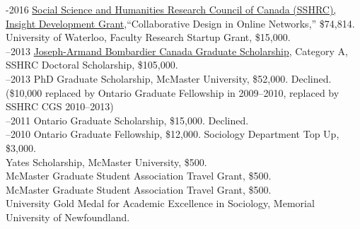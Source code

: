 \documentclass[11pt,usenames,dvipsnames]{article}
\begin{document}



-2016 \href{http://www.sshrc-crsh.gc.ca/funding-financement/programs-programmes/insight_development_grants-subventions_de_developpement_savoir-eng.aspx}{Social Science and Humanities Research Council of Canada (SSHRC), Insight Development Grant},``Collaborative Design in Online Networks,'' \$74,814. \\

 University of Waterloo, Faculty Research Startup Grant, \$15,000. \\

–2013 \href{http://www.sshrc-crsh.gc.ca/funding-financement/programs-programmes/fellowships/doctoral-doctorat-eng.aspx}{Joseph-Armand Bombardier Canada Graduate Scholarship}, Category A, SSHRC Doctoral Scholarship, \$105,000.\\

–2013 PhD Graduate Scholarship, McMaster University, \$52,000. Declined. (\$10,000 replaced by Ontario Graduate Fellowship in 2009–2010, replaced by SSHRC CGS 2010–2013)\\

–2011 Ontario Graduate Scholarship, \$15,000. Declined.\\

–2010 Ontario Graduate Fellowship, \$12,000. Sociology Department Top Up, \$3,000.\\

 Yates Scholarship, McMaster University, \$500.\\

 McMaster Graduate Student Association Travel Grant, \$500.\\

 McMaster Graduate Student Association Travel Grant, \$500.\\

 University Gold Medal for Academic Excellence in Sociology, Memorial University of Newfoundland.\\
\end{document}
